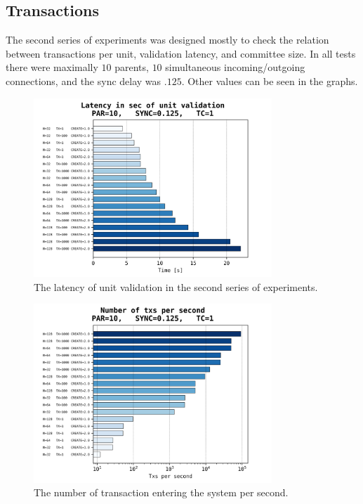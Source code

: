 \documentclass[a4paper,10pt]{article}
\begin{document}
		\subsection{Transactions}
		\FloatBarrier
			The second series of experiments was designed mostly to check the relation between transactions per unit, validation latency, and committee size.
			In all tests there were maximally $10$ parents, $10$ simultaneous incoming/outgoing connections, and the sync delay was $.125$.
			Other values can be seen in the graphs.
			\begin{figure}[h]
				\centering
				\includegraphics[width=0.8\textwidth]{bar_plots/final_exp2/create_ord_del.png}
				\caption{The latency of unit validation in the second series of experiments.}
				\label{fig:transactionsLatency}
			\end{figure}
			\begin{figure}[h]
				\centering
				\includegraphics[width=0.8\textwidth]{bar_plots/final_exp2/txps.png}
				\caption{The number of transaction entering the system per second.}
				\label{fig:transactionsTxps}
			\end{figure}
\end{document}
